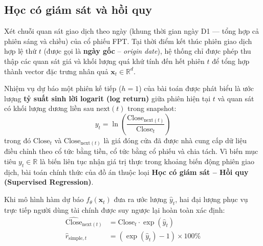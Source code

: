 \documentclass[12pt,a4paper]{report}
\begin{document}
\subsection{Học có giám sát và hồi quy}
Xét chuỗi quan sát giao dịch theo ngày (khung thời gian ngày D1 — tổng hợp cả phiên sáng và chiều) của cổ phiếu FPT. Tại thời điểm kết thúc phiên giao dịch hợp lệ thứ $t$ (được gọi là \textbf{ngày gốc} -- \textit{origin date}), hệ thống chỉ được phép thu thập các quan sát giá và khối lượng quá khứ tính đến hết phiên $t$ để tổng hợp thành vector đặc trưng nhân quả $\mathbf{x}_t \in \mathbb{R}^d$.

Nhiệm vụ dự báo một phiên kế tiếp ($h = 1$) của bài toán được phát biểu là ước lượng \textbf{tỷ suất sinh lời logarit (log return)} giữa phiên hiện tại $t$ và quan sát có khối lượng dương liền sau $\text{next}(t)$ trong snapshot:
\begin{equation}
    y_t = \ln\left(\frac{\text{Close}_{\text{next}(t)}}{\text{Close}_t}\right)
    \label{eq:ch1_log_return}
\end{equation}
trong đó $\text{Close}_t$ và $\text{Close}_{\text{next}(t)}$ là giá đóng cửa đã được nhà cung cấp dữ liệu điều chỉnh theo cổ tức bằng tiền, cổ tức bằng cổ phiếu và chia tách. Vì biến mục tiêu $y_t \in \mathbb{R}$ là biến liên tục nhận giá trị thực trong khoảng biến động phiên giao dịch, bài toán chính thức của đồ án thuộc loại \textbf{Học có giám sát -- Hồi quy (Supervised Regression)}.

Khi mô hình hàm dự báo $f_\theta(\mathbf{x}_t)$ đưa ra ước lượng $\hat{y}_t$, hai đại lượng phục vụ trực tiếp người dùng tài chính được suy ngược lại hoàn toàn xác định:
\begin{align}
    \widehat{\text{Close}}_{\text{next}(t)} &= \text{Close}_t \cdot \exp(\hat{y}_t) \label{eq:ch1_price} \\
    \hat{r}_{\text{simple}, t} &= \left(\exp(\hat{y}_t) - 1\right) \times 100\% \label{eq:ch1_simple_ret}
\end{align}
\end{document}
